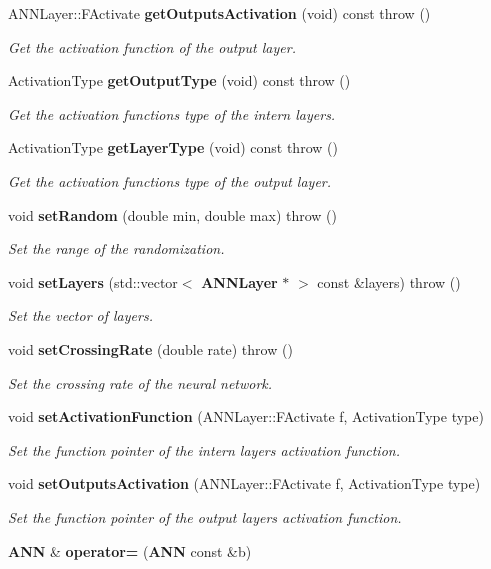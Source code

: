 \begin{DoxyCompactItemize}
A\+N\+N\+Layer\+::\+F\+Activate {\bf get\+Outputs\+Activation} (void) const   throw ()
\begin{DoxyCompactList}\small\item\em Get the activation function of the output layer. \end{DoxyCompactList}\item 
Activation\+Type {\bf get\+Output\+Type} (void) const   throw ()
\begin{DoxyCompactList}\small\item\em Get the activation function\textquotesingle{}s type of the intern layers. \end{DoxyCompactList}\item 
Activation\+Type {\bf get\+Layer\+Type} (void) const   throw ()
\begin{DoxyCompactList}\small\item\em Get the activation function\textquotesingle{}s type of the output layer. \end{DoxyCompactList}\item 
void {\bf set\+Random} (double min, double max)  throw ()
\begin{DoxyCompactList}\small\item\em Set the range of the randomization. \end{DoxyCompactList}\item 
void {\bf set\+Layers} (std\+::vector$<$ {\bf A\+N\+N\+Layer} $\ast$ $>$ const \&layers)  throw ()
\begin{DoxyCompactList}\small\item\em Set the vector of layers. \end{DoxyCompactList}\item 
void {\bf set\+Crossing\+Rate} (double rate)  throw ()
\begin{DoxyCompactList}\small\item\em Set the crossing rate of the neural network. \end{DoxyCompactList}\item 
void {\bf set\+Activation\+Function} (A\+N\+N\+Layer\+::\+F\+Activate f, Activation\+Type type)
\begin{DoxyCompactList}\small\item\em Set the function pointer of the intern layers activation function. \end{DoxyCompactList}\item 
void {\bf set\+Outputs\+Activation} (A\+N\+N\+Layer\+::\+F\+Activate f, Activation\+Type type)
\begin{DoxyCompactList}\small\item\em Set the function pointer of the output layer\textquotesingle{}s activation function. \end{DoxyCompactList}\item 
{\bf A\+N\+N} \& {\bfseries operator=} ({\bf A\+N\+N} const \&b)\label{class_g_a_n_n_1_1_a_n_n_a854dad61d6d8099bf1b9a8d3930a73ab}


\end{DoxyCompactItemize}
